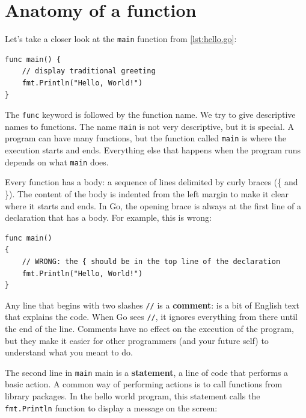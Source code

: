 \section{Anatomy of a function}
\label{function!syntax}

Let's take a closer look at the {\tt main} function from \ref{lst:hello.go}:

\begin{lstlisting}
func main() {
	// display traditional greeting
	fmt.Println("Hello, World!")
}
\end{lstlisting}


The {\tt func} keyword is followed by the function name. We try to give
descriptive names to functions. The name {\tt main} is not very descriptive,
but it is special. A program can have many functions, but the function called
{\tt main} is where the execution starts and ends. Everything else that
happens when the program runs depends on what {\tt main} does.


Every function has a body: a sequence of lines delimited by curly braces (\{
and \}). The content of the body is indented from the left margin to make it
clear where it starts and ends. In Go, the opening brace is always at the
first line of a declaration that has a body. For example, this is
wrong:

\begin{lstlisting}
func main()
{
	// WRONG: the { should be in the top line of the declaration
	fmt.Println("Hello, World!")
}
\end{lstlisting}


Any line that begins with two slashes {\tt //} is a {\bf comment}: is a bit of
English text that explains the code. When Go sees {\tt //}, it ignores
everything from there until the end of the line. Comments have no effect on
the execution of the program, but they make it easier for other programmers
(and your future self) to understand what you meant to do.

The second line in {\tt main} main is a {\bf statement}, a line of code that
performs a basic action. A common way of performing actions is to call
functions from library packages. In the hello world program, this statement
calls the {\tt fmt.Println} function to display a message on the screen:

